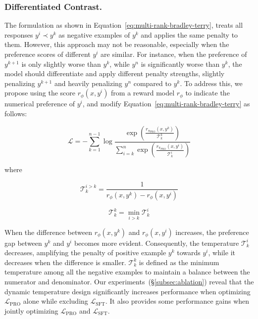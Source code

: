 \subsubsection{Differentiated Contrast.} The formulation as shown in Equation~\ref{eq:multi-rank-bradley-terry}, treats all responses $y^i \prec y^k$ as negative examples of $y^k$ and applies the same penalty to them. However, this approach may not be reasonable, especially when the preference scores of different $y^i$ are similar. For instance, when the preference of $y^{k+1}$ is only slightly worse than $y^k$, while $y^n$ is significantly worse than $y^k$, the model should differentiate and apply different penalty strengths, slightly penalizing $y^{k+1}$ and heavily penalizing $y^n$ compared to $y^k$. To address this, we propose using the score $r_{\phi}(x, y^i)$ from a reward model $r_{\phi}$ to indicate the numerical preference of $y^i$,  and modify Equation~\ref{eq:multi-rank-bradley-terry} as follows:

\begin{equation}
\mathcal{L} = -\sum_{k=1}^{n-1} \log \frac{\exp\left( \frac{ r_{\pi_{\text{PRO}}}(x, y^k)}{\mathcal{T}^k_k} \right)}{\sum_{i=k}^{n}\exp\left( \frac{r_{\pi_{\text{PRO}}}(x, y^i)}{\mathcal{T}^i_k} \right)}
\label{equ:temperature_pro}
\end{equation}

where

\begin{equation}
\mathcal{T}^{i>k}_k = \frac{1}{r_{\phi}(x, y^k) - r_{\phi}(x, y^i)}
\end{equation}

\begin{equation}
\mathcal{T}^k_k = \min_{i>k} \mathcal{T}^{i}_k
\end{equation}

When the difference between $r_{\phi}(x, y^k)$ and $r_{\phi}(x, y^i)$ increases, the preference gap between $y^k$ and $y^i$ becomes more evident. Consequently, the temperature $\mathcal{T}^{i}_k$ decreases, amplifying the penalty of positive example $y^k$ towards $y^i$, while it decreases when the difference is smaller.
$\mathcal{T}^{k}_k$ is defined as the minimum temperature among all the negative examples to maintain a balance between the numerator and denominator. Our experiments~(\S\ref{subsec:ablation}) reveal that the dynamic temperature design significantly increases performance when optimizing $\mathcal{L}_{\text{PRO}}$ alone while excluding $\mathcal{L}_{\text{SFT}}$. It also provides some performance gains when jointly optimizing $\mathcal{L}_{\text{PRO}}$ and $\mathcal{L}_{\text{SFT}}$.

